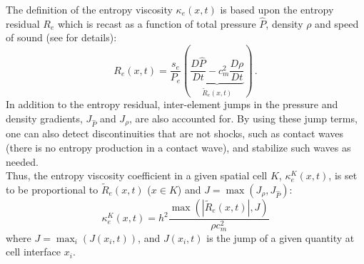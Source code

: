 \documentclass[times,doublespace]{fldauth}%
\begin{document}
The definition of the entropy viscosity $\kappa_e(x,t)$ is based upon the entropy residual $R_e$ which is recast as a function of 
total pressure $\hat{P}$, density $\rho$ and speed of sound (see \cite{our_jcp_radhy_paper} for details):
%
\begin{equation}
\label{eq:equation9}
R_e(x,t) = \frac{s_e}{P_e} \left(  \underbrace{ \frac{D\hat{P}}{Dt} - c_m^2 \frac{D\rho}{Dt} }_\textrm{$\tilde{R}_e(x,t)$} \right) \,.
\end{equation}
%
In addition to the entropy residual, inter-element jumps in the pressure and density gradients, $J_{\hat{P}}$ and $J_{\rho}$, are also accounted for. 
By using these jump terms, one can also detect discontinuities that are not shocks, such as contact waves (there is no entropy production in a contact wave), 
and stabilize such waves as needed. \\
Thus, the entropy viscosity coefficient in a given spatial cell $K$, $\kappa^K_e(x,t)$, is set to be proportional to $\tilde{R}_e(x,t)$ ($x \in K$)
and $J= \max( J_{\rho}, J_{\hat{P}})$: 
\begin{equation}
\label{eq:equation12}
\kappa^K_e(x,t) = h^2 \frac{\max (|\tilde{R}_e(x,t)|, J)}{\rho c^2_m}
\end{equation} 
where $J = \max_i (J(x_i,t))$, and $J(x_i,t)$ is the jump of a given quantity at cell interface $x_i$. 
\end{document}
